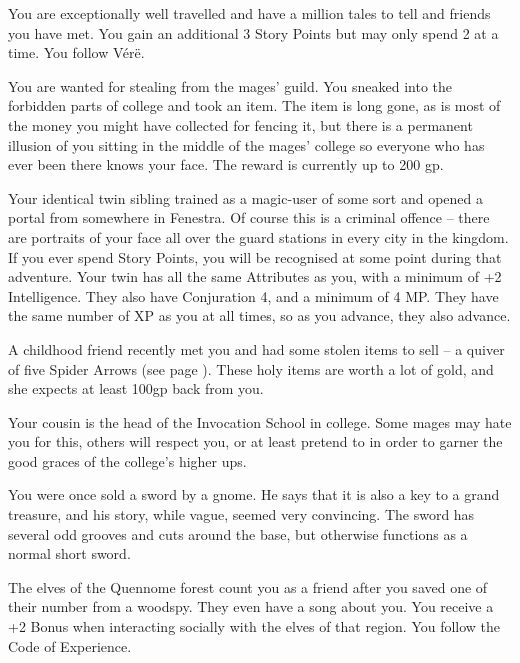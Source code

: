 \begin{multicols}{2}
\begin{list}{\addtocounter{list}{1}\textbf{:}}{\raggedleft}
	\item
	You are exceptionally well travelled and have a million tales to tell and friends you have met.
	You gain an additional 3 Story Points but may only spend 2 at a time.
	You follow V\'er\"e.

	\item
	You are wanted for stealing from the mages' guild.
You sneaked into the forbidden parts of \gls{college} and took an item.
The item is long gone, as is most of the money you might have collected for fencing it, but there is a permanent illusion of you sitting in the middle of the mages' \gls{college} so everyone who has ever been there knows your face.
The reward is currently up to 200 gp.

	\item
	Your identical twin sibling trained as a magic-user of some sort and opened a portal from somewhere in Fenestra.
	Of course this is a criminal offence -- there are portraits of your face all over the guard stations in every city in the kingdom.
	If you ever spend Story Points, you will be recognised at some point during that adventure.
	Your twin has all the same Attributes as you, with a minimum of +2 Intelligence.
	They also have Conjuration 4, and a minimum of 4 MP.
	They have the same number of XP as you at all times, so as you advance, they also advance.


	\item
	A childhood friend recently met you and had some stolen items to sell -- a quiver of five Spider Arrows (see page \pageref{spiderarrows}).
These holy items are worth a lot of gold, and she expects at least 100gp back from you.

	\item
	Your cousin is the head of the Invocation School in \gls{college}. Some mages may hate you for this, others will respect you, or at least pretend to in order to garner the good graces of the \gls{college}'s higher ups.

	\item
	You were once sold a sword by a gnome.
	He says that it is also a key to a grand treasure, and his story, while vague, seemed very convincing.
	The sword has several odd grooves and cuts around the base, but otherwise functions as a normal short sword.

	\item
	The elves of the Quennome forest count you as a friend after you saved one of their number from a woodspy.
	They even have a song about you.
	You receive a +2 Bonus when interacting socially with the elves of that region.
	You follow the Code of Experience.


\end{list}
\end{multicols}
